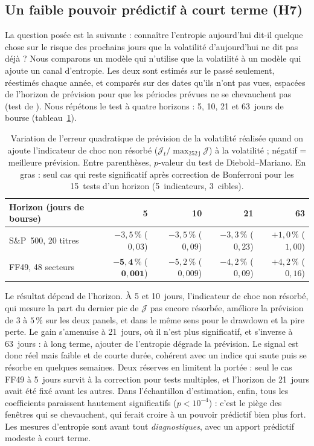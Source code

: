 \documentclass[11pt]{article}
\theoremstyle{definition}
\newcommand{\JJ}{\mathcal{J}}
\begin{document}
\subsection{Un faible pouvoir prédictif à court terme (H7)}

La question posée est la suivante : connaître l'entropie aujourd'hui dit-il
quelque chose sur le risque des prochains jours que la volatilité
d'aujourd'hui ne dit pas déjà ? Nous comparons un modèle qui n'utilise que la
volatilité à un modèle qui ajoute un canal d'entropie. Les deux sont estimés
sur le passé seulement, réestimés chaque année, et comparés sur des dates
qu'ils n'ont pas vues, espacées de l'horizon de prévision pour que les
périodes prévues ne se chevauchent pas (test de \citet{dm1995}). Nous
répétons le test à quatre horizons : 5, 10, 21 et 63~jours de bourse
(tableau~\ref{tab:h7}).

\begin{table}[htbp]
\centering
\small
\begin{tabular}{@{}lrrrr@{}}
\toprule
Horizon (jours de bourse) & 5 & 10 & 21 & 63 \\
\midrule
S\&P~500, 20 titres & $-3{,}5\,\%$ ($0{,}03$) & $-3{,}5\,\%$ ($0{,}09$) & $-3{,}3\,\%$ ($0{,}23$) & $+1{,}0\,\%$ ($1{,}00$) \\
FF49, 48 secteurs & $\mathbf{-5{,}4\,\%}$ ($\mathbf{0{,}001}$) & $-5{,}2\,\%$ ($0{,}009$) & $-4{,}2\,\%$ ($0{,}09$) & $+4{,}2\,\%$ ($0{,}16$) \\
\bottomrule
\end{tabular}
\caption{Variation de l'erreur quadratique de prévision de la volatilité
réalisée quand on ajoute l'indicateur de choc non résorbé
($\JJ_t/\max_{252\,\text{j}}\JJ$) à la volatilité ; négatif = meilleure
prévision. Entre parenthèses, $p$-valeur du test de Diebold--Mariano. En
gras : seul cas qui reste significatif après correction de Bonferroni pour
les 15~tests d'un horizon (5~indicateurs, 3~cibles).}
\label{tab:h7}
\end{table}

Le résultat dépend de l'horizon. À 5 et 10~jours, l'indicateur de choc non
résorbé, qui mesure la part du dernier pic de $\JJ$ pas encore résorbée,
améliore la prévision de $3$ à $5\,\%$ sur les deux panels, et dans le même
sens pour le drawdown et la pire perte. Le gain s'amenuise à 21~jours, où il
n'est plus significatif, et s'inverse à 63~jours : à long terme, ajouter de
l'entropie dégrade la prévision. Le signal est donc réel mais faible et de
courte durée, cohérent avec un indice qui saute puis se résorbe en quelques
semaines. Deux réserves en limitent la portée : seul le cas FF49 à 5~jours
survit à la correction pour tests multiples, et l'horizon de 21~jours avait
été fixé avant les autres. Dans l'échantillon d'estimation, enfin, tous les
coefficients paraissent hautement significatifs ($p<10^{-4}$) : c'est le
piège des fenêtres qui se chevauchent, qui ferait croire à un pouvoir
prédictif bien plus fort. Les mesures d'entropie sont avant tout
\emph{diagnostiques}, avec un apport prédictif modeste à court terme.
\end{document}
